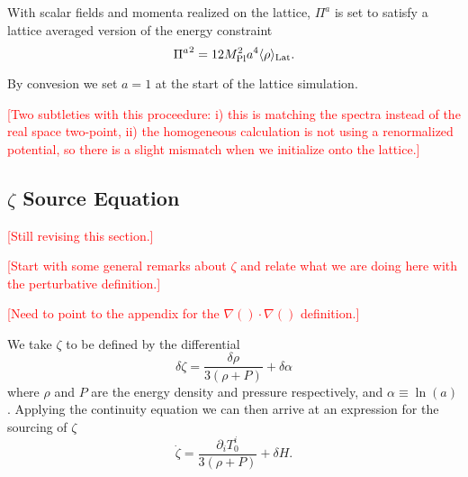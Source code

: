 
With scalar fields and momenta realized on the lattice, $\Pi^a$ is set to satisfy a lattice averaged version of the energy constraint
\begin{equation} \label{eq:energy constraint}
  {\Pi^a}^2 = 12M_{\mathrm{Pl}}^2a^4\langle \rho \rangle_{\mathrm{Lat}}.
\end{equation}

By convesion we set $a=1$ at the start of the lattice simulation.

\textcolor{red}{[Two subtleties with this proceedure: i) this is matching the spectra instead of the real space two-point, ii) the homogeneous calculation is not using a renormalized potential, so there is a slight mismatch when we initialize onto the lattice.]}

\subsection{$\zeta$ Source Equation} \label{sec:zeta source}
\textcolor{red}{[Still revising this section.]}

\textcolor{red}{[Start with some general remarks about $\zeta$ and relate what we are doing here with the perturbative definition.]}

\textcolor{red}{[Need to point to the appendix for the $\nabla()\cdot\nabla()$ definition.]}

We take $\zeta$ to be defined by the differential
\begin{equation} \label{eq:zeta differential}
  \delta\zeta = \frac{\delta\rho}{3(\rho + P)} + \delta\alpha
\end{equation} 
where $\rho$ and $P$ are the energy density and pressure respectively, and $\alpha \equiv \ln(a)$.
Applying the continuity equation we can then arrive at an expression for the sourcing of $\zeta$
\begin{equation} \label{eq:zeta source T}
  \dot{\zeta} = \frac{\partial_iT^i_0}{3(\rho+P)} + \delta H. %
\end{equation}


